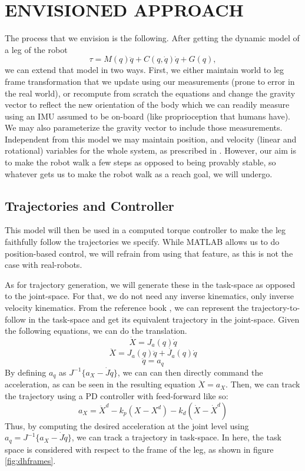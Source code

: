 \section{ENVISIONED APPROACH}
The process that we envision is the following. After getting the dynamic model of a leg of the robot
$$
\tau = M(q)\ddot{q} + C(q,\dot{q})\dot{q} + G(q),
$$ we can extend that model in two ways.
First, we either maintain world to leg frame transformation that we update using our measurements (prone to error in the real world), or recompute from scratch the equations and change the gravity vector to reflect the new orientation of the body which we can readily measure using an IMU assumed to be on-board (like proprioception that humans have). We may also parameterize the gravity vector to include those measurements. Independent from this model we may maintain position, and velocity (linear and rotational) variables for the whole system, as prescribed in \cite{hardt2003dynamic}. However, our aim is to make the robot walk a few steps as opposed to being provably stable, so whatever gets us to make the robot walk as a reach goal, we will undergo.

\subsection{Trajectories and Controller} \label{sec:trajectories}
This model will then be used in a computed torque controller to make the leg faithfully follow the trajectories we specify. While MATLAB allows us to do position-based control, we will refrain from using that feature, as this is not the case with real-robots.

As for trajectory generation, we will generate these in the task-space as opposed to the joint-space. For that, we do not need any inverse kinematics, only inverse velocity kinematics. From the reference book \cite{spong2006robot}, we can represent the trajectory-to-follow in the task-space and get its equivalent trajectory in the joint-space.
Given the following equations, we can do the translation.
$$
\dot{X} = J_a(q)\dot{q} 
$$
$$
\ddot{X} = J_a(q)\ddot{q} + \dot{J_a}(q)\dot{q}
$$
$$
\ddot{q} = a_q
$$
By defining $a_q$ as $J^{-1}\{a_X - \dot{J}\dot{q}\}$, we can can then directly command the acceleration, as can be seen in the resulting equation $\ddot{X} = a_X$. Then, we can track the trajectory using a PD controller with feed-forward like so:
$$
a_X = \ddot{X}^d - k_p (X - X^d) - k_d (\dot{X} - \dot{X}^d)
$$
Thus, by computing the desired acceleration at the joint level using $a_q = J^{-1}\{a_X - \dot{J}\dot{q}\}$, we can track a trajectory in task-space. In here, the task space is considered with respect to the frame of the leg, as shown in figure \ref{fig:dhframes}.

